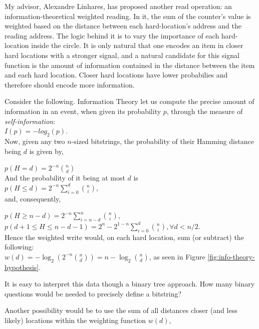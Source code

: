 My advisor, Alexandre Linhares, has proposed another read operation: an information-theoretical weighted reading. In it, the sum of the counter's value is weighted based on the distance between each hard-location's address and the reading address. The logic behind it is to vary the importance of each hard-location inside the circle.  It is only natural that one encodes an item in closer hard locations with a stronger signal, and a natural candidate for this signal function is the amount of information contained in the distance between the item and each hard location.  Closer hard locations have lower probabilies and therefore should encode more information.

Consider the following. Information Theory \citep{cover2012elements} let us compute the precise amount of information in an event, when given its probability $p$, through the measure of \emph{self-information}:\\

$I(p)= -log_2(p).$ \\

Now, given any two $n$-sized bitstrings, the probability of their Hamming distance being $d$ is given by,


$p(H=d)= {2^{-n} \binom{n}{d} }$ \\

And the probability of it being at most $d$ is \\

$p(H\leq d)= 2^{-n} {\displaystyle\sum_{i=0}^{d}{\binom{n}{i}}}  $, \\

and, consequently,

$p(H\geq n-d)=2^{-n}{\displaystyle\sum_{i=n-d}^{n}{\binom{n}{i}}  }$, \\

$p(d+1 \leq H \leq n-d-1)=2^n - 2^{1-n}{\displaystyle\sum_{i=0}^{d}{\binom{n}{i}}, \forall d<n/2}$. \\

Hence the weighted write would, on each hard location, sum (or subtract) the following:  \\

$w(d) = -\log_2 \left( 2^{-n} \binom{n}{d} \right) = n - \log_2 \binom{n}{d}$, as seen in Figure \ref{fig:info-theory-hypothesis}.

It is easy to interpret this data though a binary tree approach.  How many binary questions would be needed to precisely define a bitstring?

Another possibility would be to use the sum of all distances closer (and less likely) locations within the weighting function $w(d)$,

